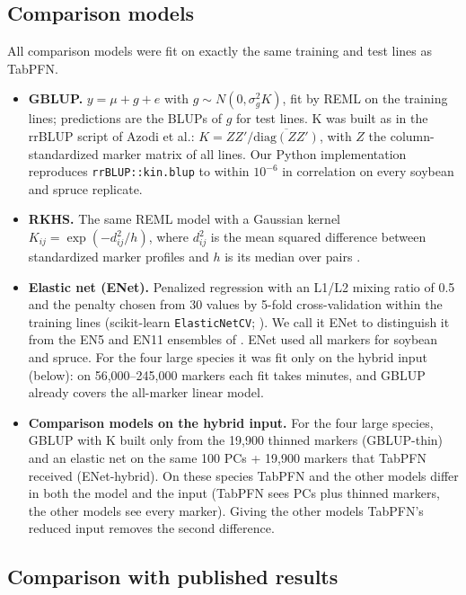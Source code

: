 \documentclass[11pt]{article}
\providecommand{\tightlist}{\setlength{\itemsep}{0pt}\setlength{\parskip}{0pt}}
\begin{document}
\subsection{Comparison models}

All comparison models were fit on exactly the same training and test lines as TabPFN.

\begin{itemize}
\tightlist
\item
  \textbf{GBLUP.} $y = \mu + g + e$ with $g \sim N(0, \sigma^2_g K)$, fit by REML on the training lines; predictions are the BLUPs of $g$ for test lines. K was built as in the rrBLUP script of Azodi et al.: $K = ZZ' / \overline{\mathrm{diag}(ZZ')}$, with $Z$ the column-standardized marker matrix of all lines. Our Python implementation reproduces \texttt{rrBLUP::kin.blup} \citep{endelman2011} to within $10^{-6}$ in correlation on every soybean and spruce replicate.
\item
  \textbf{RKHS.} The same REML model with a Gaussian kernel $K_{ij} = \exp(-d^2_{ij} / h)$, where $d^2_{ij}$ is the mean squared difference between standardized marker profiles and $h$ is its median over pairs \citep{gianola2006,delosCampos2013}.
\item
  \textbf{Elastic net (ENet).} Penalized regression with an L1/L2 mixing ratio of 0.5 and the penalty chosen from 30 values by 5-fold cross-validation within the training lines (scikit-learn \texttt{ElasticNetCV}; \citealp{pedregosa2011}). We call it ENet to distinguish it from the EN5 and EN11 ensembles of \citet{azodi2019}. ENet used all markers for soybean and spruce. For the four large species it was fit only on the hybrid input (below): on 56,000--245,000 markers each fit takes minutes, and GBLUP already covers the all-marker linear model.
\item
  \textbf{Comparison models on the hybrid input.} For the four large species, GBLUP with K built only from the 19,900 thinned markers (GBLUP-thin) and an elastic net on the same 100 PCs + 19,900 markers that TabPFN received (ENet-hybrid). On these species TabPFN and the other models differ in both the model and the input (TabPFN sees PCs plus thinned markers, the other models see every marker). Giving the other models TabPFN's reduced input removes the second difference.
\end{itemize}

\subsection{Comparison with published results}
\end{document}
